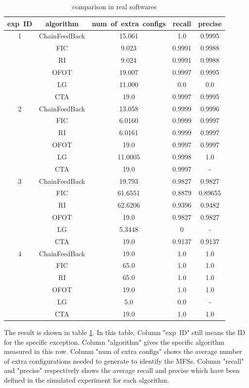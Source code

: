 \documentclass[10pt,journal,cspaper,compsoc]{IEEEtran}
\begin{document}
 \begin{table}\renewcommand{\arraystretch}{1.3}
  \caption{comparison in real softwares} \centering
  \label{compare-casestudy}

  \begin{tabular}{c|c|c|c|c}
  \hline
  \bfseries exp\ ID& \bfseries  algorithm   & \bfseries num\ of\ extra\ configs & \bfseries recall & \bfseries precise\\
   \hline
  1 & ChainFeedBack & 15.061 & 1.0 & 0.9995\\
  \  & FIC  &9.023& 0.9991 & 0.9988 \\
  \ & RI & 9.024 & 0.9991 & 0.9988 \\
  \  & OFOT &19.007 & 0.9997 & 0.9995 \\
  \  & LG &11.000 & 0.0 & 0.0\\
  \  & CTA &19.0 & 0.9997 & 0.9995\\
  \hline
  2 & ChainFeedBack & 13.058 & 0.9999 & 0.9996\\
  \  & FIC  &6.0160& 0.9999 & 0.9997 \\
  \ & RI & 6.0161 & 0.9999 & 0.9997 \\
  \ & OFOT &19.0 & 0.9997 & 0.9997 \\
  \  & LG &11.0005 & 0.9998 & 1.0\\
  \  & CTA &19.0 & 0.9997 & -\\
  \hline
  3 & ChainFeedBack & 19.793 & 0.9827 & 0.9827\\
  \  & FIC  &61.6551& 0.8879 & 0.89655 \\
  \ & RI & 62.6206 & 0.9396 & 0.9482 \\
  \ & OFOT &19.0 & 0.9827 & 0.9827 \\
  \  & LG &5.3448& 0 & -\\
  \  & CTA &19.0 & 0.9137 & 0.9137\\
  \hline
  4 & ChainFeedBack & 19.0 & 1.0 & 1.0\\
  \  & FIC  &65.0& 1.0 & 1.0 \\
  \ & RI & 65.0 & 1.0 & 1.0 \\
  \ & OFOT &19.0 & 1.0 & 1.0 \\
  \  & LG &5.0 & 0.0 & -\\
  \  & CTA &19.0 &1.0 & 1.0
  \end{tabular}
\end{table}

 The result is shown in table \ref{compare-casestudy}. In this table, Column "exp\ ID" still means the ID for the specific exception. Column "algorithm" gives the specific algorithm measured in this row. Column "num of extra configs" shows the average number of extra configurations needed to generate to identify the MFSs. Column "recall" and "precise" respectively shows the average recall and precise which have been defined in the simulated experiment for each algorithm.
\end{document}
